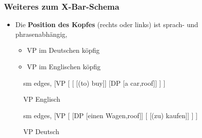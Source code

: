 \begin{frame}
\frametitle{Weiteres zum X-Bar-Schema}

\begin{itemize}
	\item Die \textbf{Position des Kopfes} (rechts oder links) ist sprach- und phrasenabhängig,
	\begin{itemize}
		\item VP im Deutschen \ras {}köpfig
		\item VP im Englischen \ras {}köpfig			
	\end{itemize}
\end{itemize}
	
\begin{minipage}[b]{0.45\textwidth}
\begin{figure}	
	\centering
	\footnotesize{
		\begin{forest}
		sm edges,
		[VP	[
					[ [(to) buy]]
					[DP [a car,roof]]
			]
		]
		\end{forest}
		}
		\caption{VP Englisch}
\end{figure}	
\end{minipage}  
%
%           
\begin{minipage}[b]{0.45\textwidth}
\begin{figure}
	\centering
	\footnotesize{
		\begin{forest}
		sm edges,
		[VP	[\MyPxbar{V}
					[DP [einen Wagen,roof]]
					[ [(zu) kaufen]]					
			]
		]
		\end{forest}
		}
		\caption{VP Deutsch}
\end{figure}	
\end{minipage}  
                     
\end{frame}


